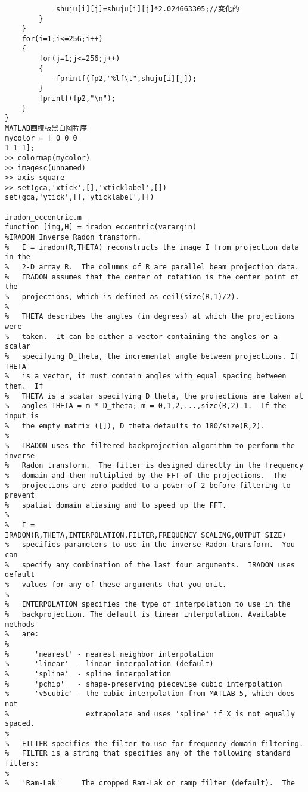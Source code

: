 \begin{lstlisting}
			shuju[i][j]=shuju[i][j]*2.024663305;//变化的
		}
	}
	for(i=1;i<=256;i++)
	{
		for(j=1;j<=256;j++)
		{
			fprintf(fp2,"%lf\t",shuju[i][j]);
		}
		fprintf(fp2,"\n");
	}
}
MATLAB画模板黑白图程序
mycolor = [ 0 0 0
1 1 1];
>> colormap(mycolor)
>> imagesc(unnamed)
>> axis square
>> set(gca,'xtick',[],'xticklabel',[])
set(gca,'ytick',[],'yticklabel',[])

iradon_eccentric.m
function [img,H] = iradon_eccentric(varargin)
%IRADON Inverse Radon transform.
%   I = iradon(R,THETA) reconstructs the image I from projection data in the
%   2-D array R.  The columns of R are parallel beam projection data.
%   IRADON assumes that the center of rotation is the center point of the
%   projections, which is defined as ceil(size(R,1)/2).
%
%   THETA describes the angles (in degrees) at which the projections were
%   taken.  It can be either a vector containing the angles or a scalar
%   specifying D_theta, the incremental angle between projections. If THETA
%   is a vector, it must contain angles with equal spacing between them.  If
%   THETA is a scalar specifying D_theta, the projections are taken at
%   angles THETA = m * D_theta; m = 0,1,2,...,size(R,2)-1.  If the input is
%   the empty matrix ([]), D_theta defaults to 180/size(R,2).
%
%   IRADON uses the filtered backprojection algorithm to perform the inverse
%   Radon transform.  The filter is designed directly in the frequency
%   domain and then multiplied by the FFT of the projections.  The
%   projections are zero-padded to a power of 2 before filtering to prevent
%   spatial domain aliasing and to speed up the FFT.
%
%   I = IRADON(R,THETA,INTERPOLATION,FILTER,FREQUENCY_SCALING,OUTPUT_SIZE)
%   specifies parameters to use in the inverse Radon transform.  You can
%   specify any combination of the last four arguments.  IRADON uses default
%   values for any of these arguments that you omit.
%
%   INTERPOLATION specifies the type of interpolation to use in the
%   backprojection. The default is linear interpolation. Available methods
%   are:
%
%      'nearest' - nearest neighbor interpolation
%      'linear'  - linear interpolation (default)
%      'spline'  - spline interpolation
%      'pchip'   - shape-preserving piecewise cubic interpolation
%      'v5cubic' - the cubic interpolation from MATLAB 5, which does not
%                  extrapolate and uses 'spline' if X is not equally spaced.
%
%   FILTER specifies the filter to use for frequency domain filtering.
%   FILTER is a string that specifies any of the following standard filters:
%
%   'Ram-Lak'     The cropped Ram-Lak or ramp filter (default).  The

\end{lstlisting}
